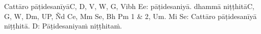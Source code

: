 \begin{outro}
	Cattāro pāṭidesanīyā\makeatletter\hyperlink{endnote-appendix}\makeatother C, D, V, W, G, Vibh Ee: pāṭidesaniyā. dhammā niṭṭhitā\makeatletter\hyperlink{endnote-appendix}\makeatother C, G, W, Dm, UP, Ñd Ce, Mm Se, Bh Pm 1 & 2, Um. Mi Se: Cattāro pāṭidesanīyā niṭṭhitā. D: Pāṭidesaniyaṁ niṭṭhitaṁ.
\end{outro}

\clearpage


